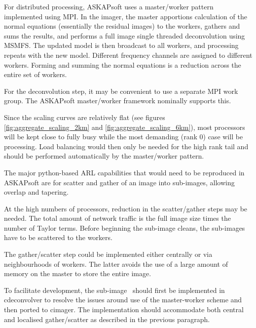 \documentclass[11pt,a4paper,variablewidth]{article}
\begin{document}
For distributed processing, ASKAPsoft uses a master/worker pattern implemented using MPI. In the imager, the master apportions calculation of the normal equations (essentially the residual images) to the workers, gathers and sums the results, and performs a full image single threaded deconvolution using MSMFS. The updated model is then broadcast to all workers, and processing repeats with the new model. Different frequency channels are assigned to different workers. Forming and summing the normal equations is a reduction across the entire set of workers.

For the deconvolution step, it may be convenient to use a separate MPI work group. The ASKAPsoft master/worker framework nominally supports this.

Since the scaling curves are relatively flat (see figures \ref{fig:aggregate_scaling_2km} and \ref{fig:aggregate_scaling_6km}), most processors will be kept close to fully busy while the most demanding (rank 0) case will be processing. Load balancing would then only be needed for the high rank tail and should be performed automatically by the master/worker pattern.

The major python-based ARL capabilities that would need to be reproduced in ASKAPsoft are for scatter and gather of an image into sub-images, allowing overlap and tapering. 

At the high numbers of processors, reduction in the scatter/gather steps may be needed. The total amount of network traffic is the full image size times the number of Taylor terms. Before beginning the sub-image cleans, the sub-images have to be scattered to the workers. 

The gather/scatter step could be implemented either centrally or via neighbourhoods of workers. The latter avoids the use of a large amount of memory on the master to store the entire image.

To facilitate development, the sub-image \MAM\ should first be implemented in cdeconvolver to resolve the issues around use of the master-worker scheme and then ported to cimager. The implementation should accommodate both central and localised gather/scatter as described in the previous paragraph.
	
\end{document}
